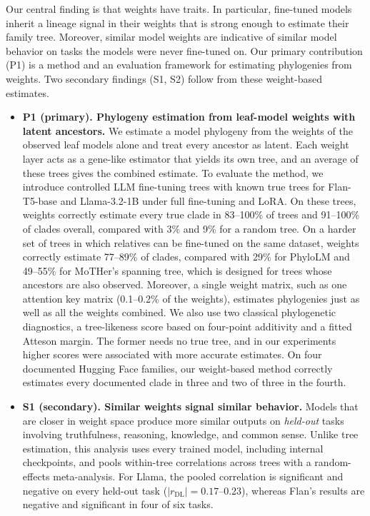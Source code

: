 \documentclass{article}
\theoremstyle{definition}
\theoremstyle{plain}
\newif\ifrevision
\newcommand{\rev}[1]{\ifrevision{\color{blue}#1}\else#1\fi}
\newcommand{\revtag}[1]{\ifrevision\textsuperscript{\color{blue}\sffamily\scriptsize[#1]}\fi}
\begin{document}
Our central finding is that weights have traits. In particular, fine-tuned models inherit a lineage signal in their weights that is strong enough to estimate their family tree. Moreover, similar model weights are indicative of similar model behavior on tasks the models were never fine-tuned on. Our primary contribution (P1) is a method and an evaluation framework for estimating phylogenies from weights. Two secondary findings (S1, S2) follow from these weight-based estimates.
\begin{itemize}[leftmargin=1.3em,itemsep=1pt,topsep=2pt,parsep=0pt]
  \item \textbf{P1 (primary). Phylogeny estimation from leaf-model weights with latent ancestors.} We estimate a model phylogeny from the weights of the observed leaf models alone and treat every ancestor as latent. Each weight layer acts as a gene-like estimator that yields its own tree, and an average of these trees gives the combined estimate. To evaluate the method, we introduce controlled LLM fine-tuning trees with known true trees for Flan-T5-base and Llama-3.2-1B under full fine-tuning and LoRA. \rev{On these trees, weights} correctly estimate every true clade in \rev{83}--100\% of trees and \rev{91}--100\%\revtag{Corr.} of clades overall, compared with 3\% and 9\% for a random tree. \rev{On a harder set of trees in which relatives can be fine-tuned on the same dataset, weights correctly estimate 77--89\% of clades, compared with 29\% for PhyloLM and 49--55\% for MoTHer's spanning tree, which is designed for trees whose ancestors are also observed.}\revtag{tWEn W1, W2; S8sV Q2} Moreover, a single weight matrix, such as one attention key matrix (0.1--0.2\% of the weights), estimates phylogenies just as well as all the weights combined. We also use two classical phylogenetic diagnostics, a tree-likeness score based on four-point additivity and a fitted Atteson margin. The former needs no true tree, and in our experiments higher scores were associated with more accurate estimates. On \rev{four}\revtag{S8sV} documented Hugging Face families, our weight-based method correctly estimates every documented clade \rev{in three and two of three in the fourth}.
  \item \textbf{S1 (secondary). Similar weights signal similar behavior.} Models that are closer in weight space produce more similar outputs on \textit{held-out} tasks involving truthfulness, reasoning, knowledge, and common sense. Unlike tree estimation, this analysis uses every trained model, including internal checkpoints, and pools within-tree correlations across trees with a random-effects meta-analysis. For Llama, the pooled correlation is significant and negative on every held-out task ($|r_{\mathrm{DL}}|=0.17$--$0.23$), whereas Flan's results are negative and significant in four of six tasks.

\end{itemize}
\end{document}

